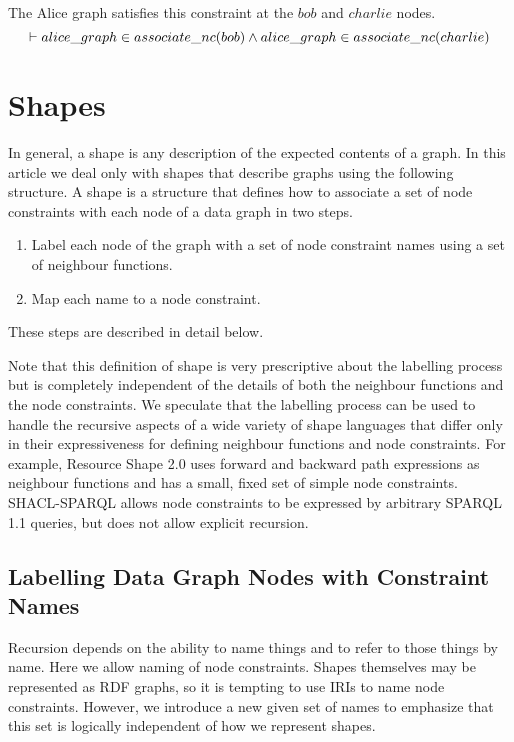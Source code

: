 \documentclass{article}
\begin{document}
The Alice graph satisfies this constraint at the $bob$ and $charlie$ nodes.
\[\vdash
	alice\_graph \in associate\_nc(bob) \land \\
	alice\_graph \in associate\_nc(charlie)
\]

\section{Shapes}
\label{sec-shapes}

In general, a shape is any description of the expected contents of a graph.
In this article we deal only with shapes that describe graphs using the following structure.
A shape is a structure that defines how to associate a set of node constraints with each node of a data graph in two steps.
\begin{enumerate}
\item Label each node of the graph with a set of node constraint names using a set of neighbour functions.
\item Map each name to a node constraint.
\end{enumerate}
These steps are described in detail below.

Note that this definition of shape is very prescriptive about the labelling process but is completely independent of the details of 
both the neighbour functions and the node constraints.
We speculate that the labelling process can be used to handle the recursive aspects of a wide variety of shape languages that differ only in their 
expressiveness for defining neighbour functions and node constraints.
For example, Resource Shape 2.0 uses forward and backward path expressions as neighbour functions and has a small, fixed set of simple node constraints. 
SHACL-SPARQL allows node constraints to be expressed by arbitrary SPARQL 1.1 queries, but does not
allow explicit recursion.

\subsection{Labelling Data Graph Nodes with Constraint Names}
Recursion depends on the ability to name things and to refer to those things by name.
Here we allow naming of node constraints.
Shapes themselves may be represented as RDF graphs, so it is tempting to use IRIs to name node constraints.
However, we introduce a new given set of names to emphasize that this set is logically independent of how we represent shapes.
\begin{zed}
	[NAME]
\end{zed}
\end{document}

